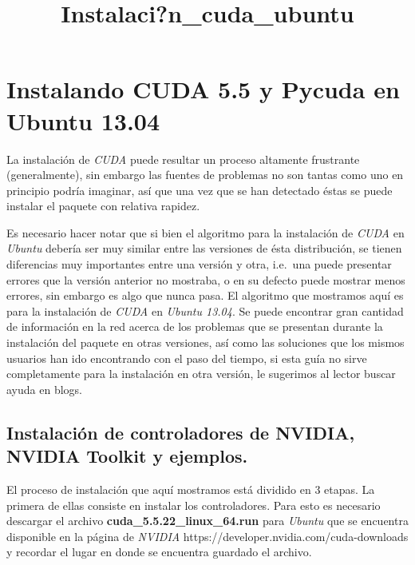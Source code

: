 \documentclass{article}
\title{Instalaci?n\_cuda\_ubuntu}
\begin{document}
    
    
    \maketitle
    
    

    

    \section{Instalando CUDA 5.5 y Pycuda en Ubuntu 13.04}


    La instalación de \emph{CUDA} puede resultar un proceso altamente
frustrante (generalmente), sin embargo las fuentes de problemas no son
tantas como uno en principio podría imaginar, así que una vez que se han
detectado éstas se puede instalar el paquete con relativa rapidez.

Es necesario hacer notar que si bien el algoritmo para la instalación de
\emph{CUDA} en \emph{Ubuntu} debería ser muy similar entre las versiones
de ésta distribución, se tienen diferencias muy importantes entre una
versión y otra, i.e.~una puede presentar errores que la versión anterior
no mostraba, o en su defecto puede mostrar menos errores, sin embargo es
algo que nunca pasa. El algoritmo que mostramos aquí es para la
instalación de \emph{CUDA} en \emph{Ubuntu 13.04}. Se puede encontrar
gran cantidad de información en la red acerca de los problemas que se
presentan durante la instalación del paquete en otras versiones, así
como las soluciones que los mismos usuarios han ido encontrando con el
paso del tiempo, si esta guía no sirve completamente para la instalación
en otra versión, le sugerimos al lector buscar ayuda en blogs.


    \subsection{Instalación de controladores de NVIDIA, NVIDIA Toolkit y ejemplos.}


    El proceso de instalación que aquí mostramos está dividido en 3 etapas.
La primera de ellas consiste en instalar los controladores. Para esto es
necesario descargar el archivo \textbf{cuda\_5.5.22\_linux\_64.run} para
\emph{Ubuntu} que se encuentra disponible en la página de \emph{NVIDIA}
https://developer.nvidia.com/cuda-downloads y recordar el lugar en donde
se encuentra guardado el archivo.
\end{document}
